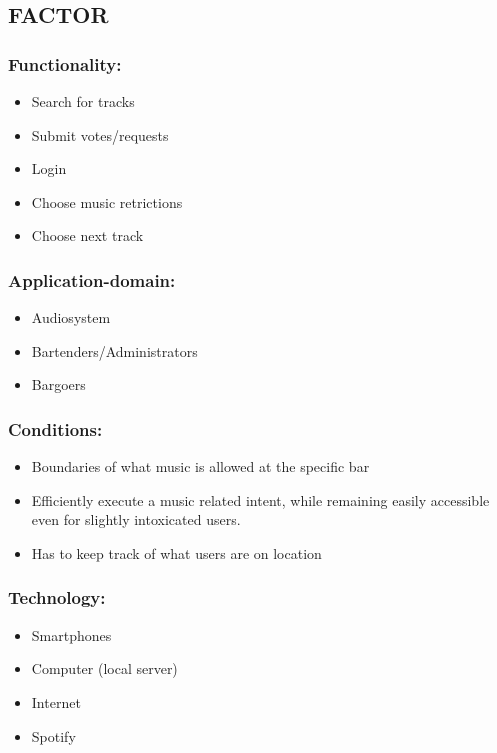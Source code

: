 \subsection{FACTOR}
\subsubsection{Functionality:}
\begin{itemize}
    \item Search for tracks
    \item Submit votes/requests
    \item Login
    \item Choose music retrictions
    \item Choose next track
\end{itemize}

\subsubsection{Application-domain:}
\begin{itemize}
    \item Audiosystem
    \item Bartenders/Administrators
    \item Bargoers
\end{itemize}

\subsubsection{Conditions:}
\begin{itemize}
    \item Boundaries of what music is allowed at the specific bar 
    \item Efficiently execute a music related intent, while remaining easily accessible even for slightly intoxicated users.
    \item Has to keep track of what users are on location
\end{itemize}



\subsubsection{Technology:}
\begin{itemize}
    \item Smartphones
    \item Computer (local server)
    \item Internet
    \item Spotify
\end{itemize}

